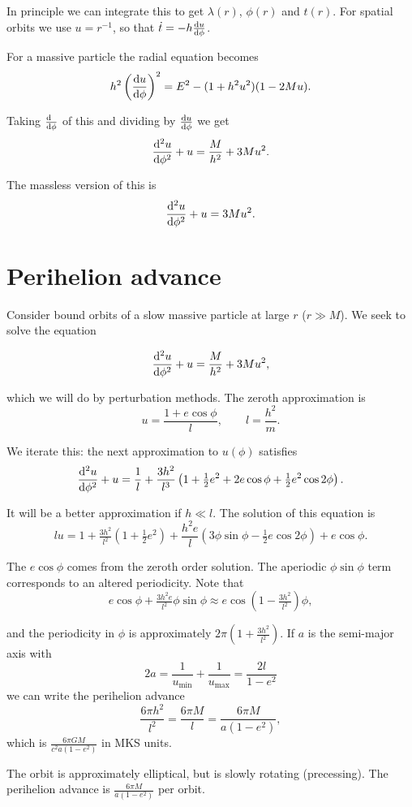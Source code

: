 \documentclass{notes}
\newcommand{\dif}[1]{\frac{\ud\phantom{#1}}{\ud#1}}
\begin{document}
In principle we can integrate this to get $\lambda(r)$, $\phi(r)$
and $t(r)$.  For spatial orbits we use $u = r^{-1}$, so that
$\Dot{t} = -h \frac{\mathrm{d} u}{\mathrm{d}\phi}$.

For a massive particle the radial equation becomes
\[
h^2 \left( \frac{\mathrm{d} u}{\mathrm{d}\phi} \right)^2
= E^2 - (1 + h^2 u^2)(1- 2 M u).
\]

Taking $\dif{\phi}$ of this and dividing by $\frac{\mathrm{d} u}{\mathrm{d}\phi}$ we get
\[
\frac{\mathrm{d}^2 u}{\mathrm{d}\phi^2} + u = \frac{M}{h^2} + 3 M u^2.
\]

The massless version of this is
\[
\frac{\mathrm{d}^2 u}{\mathrm{d}\phi^2} + u = 3 M u^2.
\]

\section{Perihelion advance}

Consider bound orbits of a slow massive particle at large $r$ ($r \gg
M$).  We seek to solve the equation

\[
\frac{\mathrm{d}^2 u}{\mathrm{d}\phi^2} + u = \frac{M}{h^2} + 3 M u^2,
\]

which we will do by perturbation methods.  The zeroth approximation is
\[
u = \frac{1 + e \cos \phi}{l}, \qquad l = \frac{h^2}{m}.
\]

We iterate this: the next approximation to $u(\phi)$ satisfies
\[
\frac{\mathrm{d}^2 u}{\mathrm{d}\phi^2} + u = \frac{1}{l} + \frac{3 h^2}{l^3}
\left( 1+\tfrac{1}{2} e^2 +2 e \cos \phi + \tfrac{1}{2} e^2 \cos 2 \phi
\right).
\]

It will be a better approximation if $h \ll l$.  The solution of this
equation is
\[
l u = 1 + \tfrac{3 h^2}{l^2} (1 + \tfrac{1}{2} e^2)
+ \frac{h^2 e}{l} \left(3 \phi \sin \phi - \tfrac{1}{2} e \cos 2 \phi\right)
+ e \cos \phi.
\]

The $e \cos \phi$ comes from the zeroth order solution.  The aperiodic
$\phi \sin \phi$ term corresponds to an altered periodicity.  Note that
\[
e \cos \phi + \tfrac{3 h^2 e}{l^2} \phi \sin \phi
\approx e \cos \left( 1- \tfrac{3 h^2}{l^2}\right)\phi,
\]

and the periodicity in $\phi$ is approximately
$2 \pi \left( 1+ \tfrac{3 h^2}{l^2}\right)$.  If $a$ is
the semi-major axis with
\[
2 a = \frac{1}{u_{\text{min}}} + \frac{1}{u_{\text{max}}}
= \frac{2 l}{1-e^2}
\]
we can write the perihelion advance
\[
\frac{6 \pi h^2}{l^2} = \frac{6 \pi M}{l}
= \frac{6 \pi M}{a (1-e^2)},
\]
which is $\tfrac{6 \pi G M}{c^2 a(1-e^2)}$ in MKS units.

The orbit is approximately elliptical, but is slowly rotating (precessing).
The perihelion advance is $\tfrac{6 \pi M}{a (1-e^2)}$ per orbit.
\end{document}
